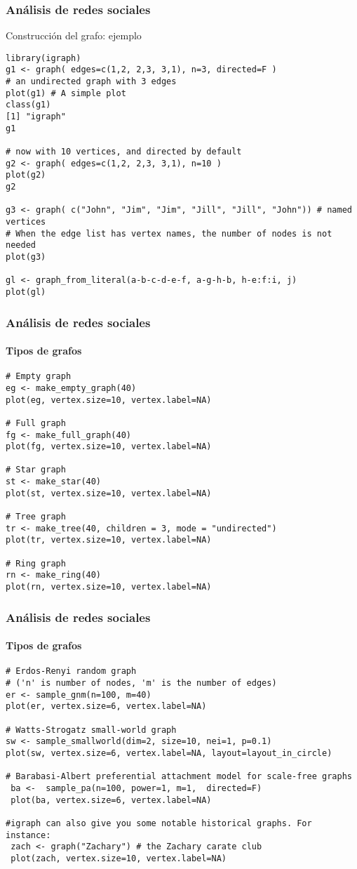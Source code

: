\documentclass[11pt]{beamer}
\begin{document}
\begin{frame}[fragile]
\frametitle{Análisis de redes sociales} 
Construcción del grafo: ejemplo

\begin{verbatim}
library(igraph)
g1 <- graph( edges=c(1,2, 2,3, 3,1), n=3, directed=F ) 
# an undirected graph with 3 edges
plot(g1) # A simple plot 
class(g1)
[1] "igraph"
g1

# now with 10 vertices, and directed by default
g2 <- graph( edges=c(1,2, 2,3, 3,1), n=10 ) 
plot(g2)   
g2

g3 <- graph( c("John", "Jim", "Jim", "Jill", "Jill", "John")) # named vertices
# When the edge list has vertex names, the number of nodes is not needed
plot(g3)

gl <- graph_from_literal(a-b-c-d-e-f, a-g-h-b, h-e:f:i, j)
plot(gl)
\end{verbatim}
\end{frame}

\begin{frame}[fragile]
\frametitle{Análisis de redes sociales} 
\framesubtitle{Tipos de grafos}
\begin{verbatim}
# Empty graph
eg <- make_empty_graph(40)
plot(eg, vertex.size=10, vertex.label=NA)

# Full graph
fg <- make_full_graph(40)
plot(fg, vertex.size=10, vertex.label=NA)

# Star graph 
st <- make_star(40)
plot(st, vertex.size=10, vertex.label=NA) 

# Tree graph
tr <- make_tree(40, children = 3, mode = "undirected")
plot(tr, vertex.size=10, vertex.label=NA) 

# Ring graph
rn <- make_ring(40)
plot(rn, vertex.size=10, vertex.label=NA)

\end{verbatim}    
\end{frame}


\begin{frame}[fragile]
\frametitle{Análisis de redes sociales} 
\framesubtitle{Tipos de grafos}
\begin{verbatim}
# Erdos-Renyi random graph 
# ('n' is number of nodes, 'm' is the number of edges)
er <- sample_gnm(n=100, m=40) 
plot(er, vertex.size=6, vertex.label=NA)  

# Watts-Strogatz small-world graph
sw <- sample_smallworld(dim=2, size=10, nei=1, p=0.1)
plot(sw, vertex.size=6, vertex.label=NA, layout=layout_in_circle)
 
# Barabasi-Albert preferential attachment model for scale-free graphs
 ba <-  sample_pa(n=100, power=1, m=1,  directed=F)
 plot(ba, vertex.size=6, vertex.label=NA)
 
#igraph can also give you some notable historical graphs. For instance:
 zach <- graph("Zachary") # the Zachary carate club
 plot(zach, vertex.size=10, vertex.label=NA)
\end{verbatim}    
\end{frame}
\end{document}
